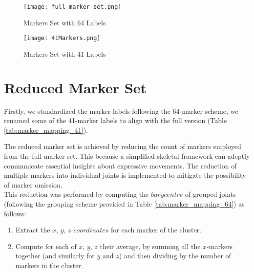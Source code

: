 \begin{figure}[H]
    \centering
    \texttt{[image: full\_marker\_set.png]}
    \caption{Markers Set with 64 Labels}
    \label{fig:64markers}
\end{figure}

\begin{figure}[H]
    \centering
    \texttt{[image: 41Markers.png]}
    \caption{Markers Set with 41 Labels}
    \label{fig:41markers}
\end{figure}

\section{Reduced Marker Set}
\label{sec:reduced_markers}
Firstly, we standardized the marker labels following the 64-marker scheme, 
we renamed some of the 41-marker labels to align with the full version (Table \ref{tab:marker_mapping_41}).

The reduced marker set is achieved by reducing the count of markers employed from the full marker set.
This because a simplified skeletal framework can adeptly communicate essential insights about expressive movements.
The reduction of multiple markers into individual joints is implemented to mitigate the possibility of marker omission. \\
This reduction was performed by computing the $barycentre$ of grouped joints (following the grouping scheme provided in Table \ref{tab:marker_mapping_64}) as follows:
\begin{enumerate}
    \item Extract the $x$, $y$, $z$ $coordinates$ for each marker of the cluster.
    \item Compute for each of $x$, $y$, $z$ their average, by summing all the $x$-markers together
    (and similarly for $y$ and $z$) and then dividing by the number of markers in the cluster.
\end{enumerate} 

